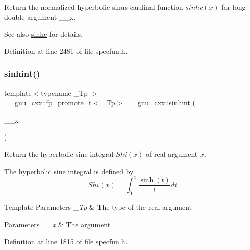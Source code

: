 Return the normalized hyperbolic sinus cardinal function $ sinhc(x) $ for {\ttfamily long double} argument {\ttfamily \+\_\+\+\_\+x}.

\begin{DoxySeeAlso}{See also}
\hyperlink{group__gnu__math__spec__func_gaf2f02e4143e7beb97352cef4b7fcb663}{sinhc} for details. 
\end{DoxySeeAlso}


Definition at line 2481 of file specfun.\+h.

\mbox{\label{group__gnu__math__spec__func_gab5cbc831c5fab99a967c03d059f1ad59}} 
\subsubsection{\texorpdfstring{sinhint()}{sinhint()}}
{\footnotesize\ttfamily template$<$typename \+\_\+\+Tp $>$ \\
\+\_\+\+\_\+gnu\+\_\+cxx\+::fp\+\_\+promote\+\_\+t$<$\+\_\+\+Tp$>$ \+\_\+\+\_\+gnu\+\_\+cxx\+::sinhint (\begin{DoxyParamCaption}\item[{\+\_\+\+Tp}]{\+\_\+\+\_\+x }\end{DoxyParamCaption})\hspace{0.3cm}{\ttfamily [inline]}}

Return the hyperbolic sine integral $ Shi(x) $ of real argument $ x $.

The hyperbolic sine integral is defined by \[ Shi(x) = \int_0^x \frac{\sinh(t)}{t}dt \]


\begin{DoxyTemplParams}{Template Parameters}
{\em \+\_\+\+Tp} & The type of the real argument \\
\hline
\end{DoxyTemplParams}

\begin{DoxyParams}{Parameters}
{\em \+\_\+\+\_\+x} & The argument \\
\hline
\end{DoxyParams}


Definition at line 1815 of file specfun.\+h.

\mbox{\label{group__gnu__math__spec__func_ga375ca3ceb1eafd678e298d0aea4bb3e6}} 
